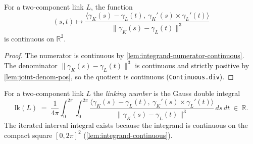 \begin{lemma}
    \label{lem:integrand-continuous}
    \leanok
    For a two-component link $L$, the function
    \[
        (s,t)\longmapsto
        \frac{\bigl\langle \gamma_K(s)-\gamma_L(t),\ \gamma_K'(s)\times\gamma_L'(t)\bigr\rangle}
             {\lVert \gamma_K(s)-\gamma_L(t)\rVert^{3}}
    \]
    is continuous on $\mathbb{R}^2$.
\end{lemma}
\begin{proof}
    The numerator is continuous by \cref{lem:integrand-numerator-continuous}. The
    denominator $\lVert\gamma_K(s)-\gamma_L(t)\rVert^{3}$ is continuous and strictly
    positive by \cref{lem:joint-denom-pos}, so the quotient is continuous
    (\texttt{Continuous.div}).
\end{proof}

\begin{definition}
    \label{def:linking-number}
    For a two-component link $L$ the \emph{linking number} is the Gauss double
    integral
    \[
        \mathrm{lk}(L) \;=\; \frac{1}{4\pi}\int_0^{2\pi}\!\!\int_0^{2\pi}
            \frac{\bigl\langle \gamma_K(s)-\gamma_L(t),\ \gamma_K'(s)\times\gamma_L'(t)\bigr\rangle}
                 {\lVert \gamma_K(s)-\gamma_L(t)\rVert^{3}}\, ds\, dt \ \in\ \mathbb{R}.
    \]
    The iterated interval integral exists because the integrand is continuous on
    the compact square $[0,2\pi]^2$ (\cref{lem:integrand-continuous}).
\end{definition}

